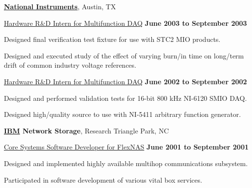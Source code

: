 \documentclass[10pt]{article}
\renewcommand\textit[1]{\underline{#1}}
\newcommand{\halfblankline}{\quad\vspace{-0.5\baselineskip}\pagebreak[3]}
\begin{document}
\halfblankline

\href{http://www.ni.com/}{\textbf{National Instruments}},
Austin, TX
\begin{outerlist}

\item[] \textit{Hardware R\&D Intern for Multifunction DAQ}%
        \hfill \textbf{June 2003 to September 2003}
\begin{innerlist}
\item Designed final verification test fixture for use with STC2 MIO
        products.
\item Designed and executed study of the effect of varying burn\-/in time
        on long\-/term drift of common industry voltage references.
\end{innerlist}

\item[] \textit{Hardware R\&D Intern for Multifunction DAQ}%
        \hfill \textbf{June 2002 to September 2002}
\begin{innerlist}
\item Designed and performed validation tests for 16-bit 800 kHz
        NI-6120 SMIO DAQ.

\item Designed high\-/quality source to use with NI-5411 arbitrary
        function generator.
\end{innerlist}

\end{outerlist}

\halfblankline

\textbf{\href{http://www.ibm.com/}{IBM} Network Storage},
Research Triangle Park, NC
\begin{outerlist}

\item[] \textit{Core Systems Software Developer for FlexNAS}%
        \hfill \textbf{June 2001 to September 2001}
\begin{innerlist}
\item Designed and implemented highly available multihop communications
        subsystem.
\item Participated in software development of various vital box
        services.
\end{innerlist}

\end{outerlist}

\halfblankline
\end{document}
